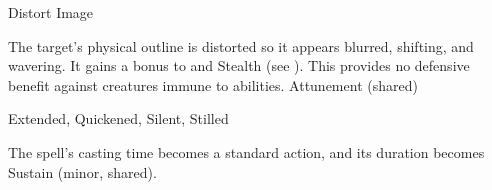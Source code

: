 \begin{spellsection}{Distort Image}
\begin{spellcontent}
\begin{spelltargetinginfo}
\end{spelltargetinginfo}
\begin{spelleffects}
\spelleffect
The target's physical outline is distorted so it appears blurred, shifting, and wavering.
It gains a  bonus to  and Stealth (see ).
This provides no defensive benefit against creatures immune to  abilities.
\spelldur Attunement (shared)
\end{spelleffects}
\end{spellcontent}
\begin{spellfooter}
 Extended, Quickened, Silent, Stilled
\end{spellfooter}
\begin{spellsubcontent}
\begin{spellcantrip}
The spell's casting time becomes a standard action, and its duration becomes Sustain (minor, shared).
\end{spellcantrip}
\end{spellsubcontent}
\end{spellsection}
